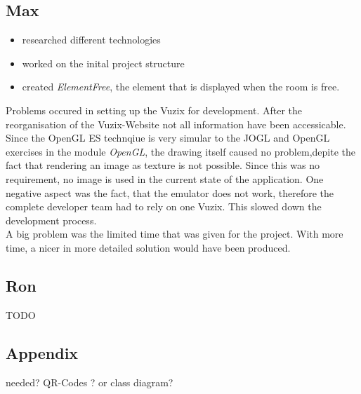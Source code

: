 \documentclass[]{article}
\begin{document}
\begin{multicols}{2}
\subsection{Max}
\begin{itemize}
\item researched different technologies
\item worked on the inital project structure
\item created \emph{ElementFree}, the element that is displayed when the room is free.
\end{itemize}
 Problems occured in setting up the Vuzix for development. After the reorganisation of the Vuzix-Website not all information have been accessicable. \\
 Since the OpenGL ES technqiue is very simular to the JOGL and OpenGL exercises in the module \emph{OpenGL}, the drawing itself caused no problem,depite the fact that rendering an image as texture is not possible. Since this was no requirement, no image is used in the current state of the application.  One negative aspect was the fact, that the emulator does not work, therefore the complete developer team had to rely on one Vuzix. This slowed down the development process.\\
 A big problem was the limited time that was given for the project.  With more time, a nicer in more detailed solution would have been produced.
\subsection{Ron}
TODO
\end{multicols}
\subsection{Appendix}
needed? QR-Codes ? or class diagram?
\end{document}
